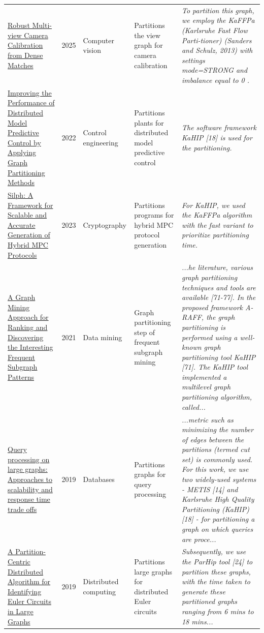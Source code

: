 \documentclass[9pt]{extarticle}
\begin{document}
\begin{longtable}{@{}>{\raggedright}p{6.6cm}r>{\raggedright}p{2.9cm}>{\raggedright}p{4.6cm}>{\raggedright\arraybackslash}p{8.4cm}@{}}
\href{https://doi.org/10.48550/arXiv.2512.15608}{Robust Multi-view Camera Calibration from Dense Matches} & 2025 & Computer vision & Partitions the view graph for camera calibration & {\footnotesize\itshape To partition this graph, we employ the KaFFPa (Karlsruhe Fast Flow Parti-tioner) (Sanders and Schulz, 2013) with settings mode=STRONG and imbalance equal to 0 .}\\
\href{https://doi.org/10.1109/ICSTCC55426.2022.9931785}{Improving the Performance of Distributed Model Predictive Control by Applying Graph Partitioning Methods} & 2022 & Control engineering & Partitions plants for distributed model predictive control & {\footnotesize\itshape The software framework KaHIP [18] is used for the partitioning.}\\
\href{https://doi.org/10.1109/SP46215.2023.10179397}{Silph: A Framework for Scalable and Accurate Generation of Hybrid MPC Protocols} & 2023 & Cryptography & Partitions programs for hybrid MPC protocol generation & {\footnotesize\itshape For KaHIP, we used the KaFFPa algorithm with the fast variant to prioritize partitioning time.}\\
\href{https://doi.org/10.1007/s44196-021-00001-4}{A Graph Mining Approach for Ranking and Discovering the Interesting Frequent Subgraph Patterns} & 2021 & Data mining & Graph partitioning step of frequent subgraph mining & {\footnotesize\itshape ...he literature, various graph partitioning techniques and tools are available [71-77]. In the proposed framework A-RAFF, the graph partitioning is performed using a well-known graph partitioning tool KaHIP [71]. The KaHIP tool implemented a multilevel graph partitioning algorithm, called...}\\
\href{https://doi.org/10.1016/j.datak.2019.101736}{Query processing on large graphs: Approaches to scalability and response time trade offs} & 2019 & Databases & Partitions graphs for query processing & {\footnotesize\itshape ...metric such as minimizing the number of edges between the partitions (termed cut set) is commonly used. For this work, we use two widely-used systems - METIS [14] and Karlsruhe High Quality Partitioning (KaHIP) [18] - for partitioning a graph on which queries are proce...}\\
\href{https://doi.org/10.1109/IPDPSW.2019.00085}{A Partition-Centric Distributed Algorithm for Identifying Euler Circuits in Large Graphs} & 2019 & Distributed computing & Partitions large graphs for distributed Euler circuits & {\footnotesize\itshape Subsequently, we use the ParHip tool [24] to partition these graphs, with the time taken to generate these partitioned graphs ranging from 6 mins to 18 mins...}\\

\end{longtable}
\end{document}

